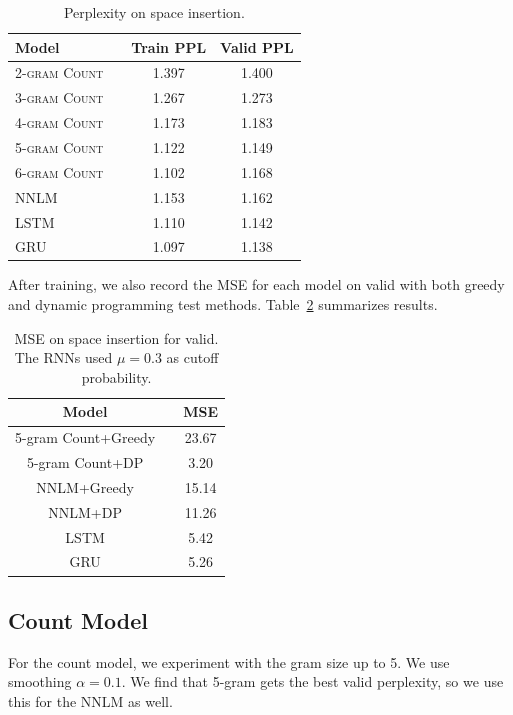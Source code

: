 \documentclass[11pt]{article}
\begin{document}
\begin{table}[h]
\centering
\begin{tabular}{llcc}
 \toprule
 Model &  & Train PPL & Valid PPL \\
 \midrule
 \textsc{2-gram Count} & &1.397 & 1.400 \\
 \textsc{3-gram Count} & &1.267 & 1.273 \\
 \textsc{4-gram Count} & &1.173 & 1.183  \\
 \textsc{5-gram Count} & &1.122 & 1.149 \\
 \textsc{6-gram Count} & &1.102 & 1.168 \\
 \textsc{NNLM} & & 1.153 & 1.162 \\
 \textsc{LSTM} & & 1.110 & 1.142 \\
 \textsc{GRU} &  & 1.097 & 1.138 \\
 \bottomrule
\end{tabular}
\caption{\label{tab:results} Perplexity on space insertion.}
\end{table}

After training, we also record the MSE for each model on valid with both greedy and dynamic programming test methods. Table~\ref{tab:mse} summarizes results.

\begin{table}[h]
\centering
  \begin{tabular}{ ccc}
    \hline Model &  & MSE \\
    \hline 5-gram Count+Greedy & & 23.67\\
    5-gram Count+DP & & 3.20 \\
    NNLM+Greedy & & 15.14\\
    NNLM+DP & & 11.26 \\
    LSTM &  & 5.42 \\
    GRU &  & 5.26 \\
    \hline
  \end{tabular}
\caption{MSE on space insertion for valid. The RNNs used $\mu = 0.3$ as cutoff probability.}
\label{tab:mse} 
\end{table}

\subsection{Count Model}

For the count model, we experiment with the gram size up to 5. We use smoothing $\alpha = 0.1$. We find that 5-gram gets the best valid perplexity, so we use this for the NNLM as well.
\end{document}
